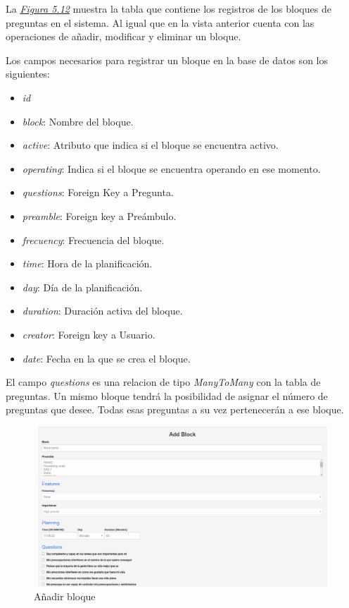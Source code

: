 La \textit{\hyperref[fig:lista-bloques]{Figura 5.12}} muestra la tabla que contiene los registros de los bloques de preguntas en el sistema. Al igual que en la vista anterior cuenta con las operaciones de añadir, modificar y eliminar un bloque. 

Los campos necesarios para registrar un bloque en la base de datos son los siguientes: \vspace{0.3cm}

\begin{itemize}
    \item \textit{id}
    \item \textit{block}: Nombre del bloque.
    \item \textit{active}: Atributo que indica si el bloque se encuentra activo.
    \item \textit{operating}: Indica si el bloque se encuentra operando en ese momento.
    \item \textit{questions}: Foreign Key a Pregunta.
    \item \textit{preamble}: Foreign key a Preámbulo.
    \item \textit{frecuency}: Frecuencia del bloque.
    \item \textit{time}: Hora de la planificación.
    \item \textit{day}: Día de la planificación.
    \item \textit{duration}: Duración activa del bloque.
    \item \textit{creator}: Foreign key a Usuario.
    \item \textit{date}: Fecha en la que se crea el bloque.
\end{itemize}

El campo \textit{questions} es una relacion de tipo \textit{ManyToMany} con la tabla de preguntas. Un mismo bloque tendrá la posibilidad de asignar el número de preguntas que desee. Todas esas preguntas a su vez pertenecerán a ese bloque.  


\begin{figure}[!ht]
    \centering
    \includegraphics[width=1\textwidth, height=6cm]{imagenes/aniadir_bloque.png}
    \caption{Añadir bloque}
    \label{fig:add-bloque}
\end{figure}

